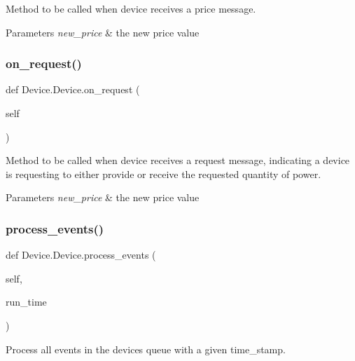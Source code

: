 Method to be called when device receives a price message. 


\begin{DoxyParams}{Parameters}
{\em new\+\_\+price} & the new price value \\
\hline
\end{DoxyParams}
\mbox{\label{class_device_1_1_device_a5261b7396dd1581d649d629fccf3029c}} 
\subsubsection{\texorpdfstring{on\+\_\+request()}{on\_request()}}
{\footnotesize\ttfamily def Device.\+Device.\+on\+\_\+request (\begin{DoxyParamCaption}\item[{}]{self }\end{DoxyParamCaption})}



Method to be called when device receives a request message, indicating a device is requesting to either provide or receive the requested quantity of power. 


\begin{DoxyParams}{Parameters}
{\em new\+\_\+price} & the new price value \\
\hline
\end{DoxyParams}
\mbox{\label{class_device_1_1_device_afd1b29eb311904ffa8565fd2d2079967}} 
\subsubsection{\texorpdfstring{process\+\_\+events()}{process\_events()}}
{\footnotesize\ttfamily def Device.\+Device.\+process\+\_\+events (\begin{DoxyParamCaption}\item[{}]{self,  }\item[{}]{run\+\_\+time }\end{DoxyParamCaption})}



Process all events in the device\textquotesingle{}s queue with a given time\+\_\+stamp. 

